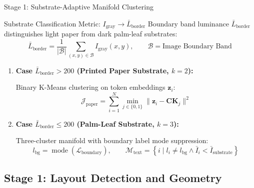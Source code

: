 \documentclass[aspectratio=169]{beamer}
\begin{document}
\begin{frame}{Stage 1: Substrate-Adaptive Manifold Clustering}
\small

\begin{block}{Substrate Classification Metric: $I_{\text{gray}} \rightarrow \bar{L}_{\text{border}}$}
\small
Boundary band luminance $\bar{L}_{\text{border}}$ distinguishes light paper from dark palm-leaf substrates:
\vspace{-1mm}
\[
  \bar{L}_{\text{border}}
  = \frac{1}{|\mathcal{B}|}
  \sum_{(x,y)\in\mathcal{B}} I_{\text{gray}}(x,y),
  \qquad
  \mathcal{B}=\text{Image Boundary Band}
\]
\end{block}

\vspace{-2mm}

\begin{enumerate}
  \setlength{\itemsep}{2mm}
  \setlength{\parskip}{0pt}

  \item \textbf{Case $\bar{L}_{\text{border}} > 200$ 
  (Printed Paper Substrate, $k=2$):}

  Binary K-Means clustering on token embeddings $\mathbf{z}_i$:
  \vspace{-2mm}
  \[
    \mathcal{J}_{\text{paper}}
    =
    \sum_{i=1}^{N}
    \min_{j\in\{0,1\}}
    \|\mathbf{z}_i-\mathbf{C K}_j\|^2
  \]

  \item \textbf{Case $\bar{L}_{\text{border}} \le 200$ 
  (Palm-Leaf Substrate, $k=3$):}

  Three-cluster manifold with boundary label mode suppression:
  \vspace{-2mm}
  \[
    l_{\text{bg}}
    =
    \operatorname{mode}
    \left(\mathcal{L}_{\text{boundary}}\right),
    \qquad
    \mathcal{M}_{\text{text}}
    =
    \left\{
      i \mid
      l_i\neq l_{\text{bg}}
      \land
      \bar{I}_i < \bar{I}_{\text{substrate}}
    \right\}
  \]
\end{enumerate}

\end{frame}

\subsection{Stage 1: Layout Detection and Geometry}
\end{document}
